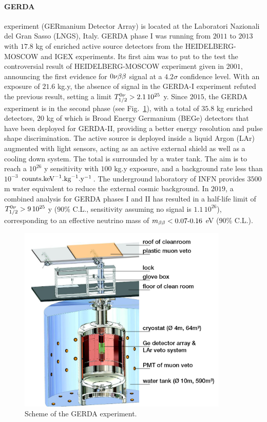 \paragraph{GERDA} experiment (GERmanium Detector Array) is located at the Laboratori Nazionali del Gran Sasso (LNGS), Italy.
GERDA phase I was running from $2011$ to $2013$ with $17.8$ kg of enriched active source detectors from the HEIDELBERG-MOSCOW and IGEX experiments.
Its first aim was to put to the test the controversial result of HEIDELBERG-MOSCOW experiment given in $2001$, announcing the first evidence for $0\nu\beta\beta$ signal at a $4.2\sigma$ confidence level.
With an exposure of $21.6$ kg.y, the absence of signal in the GERDA-I experiment refuted the previous result, setting a limit $T_{1/2}^{0\nu}>2.1\, 10^{25}$ y.
Since $2015$, the GERDA experiment is in the second phase (see Fig.~\ref{fig:GERDA}), with a total of $35.8$ kg enriched detectors, $20$ kg of which is Broad Energy Germanium (BEGe) detectors that have been deployed for GERDA-II, providing a better energy resolution and pulse shape discrimination.
The active source is deployed inside a liquid Argon (LAr) augmented with light sensors, acting as an active external shield as well as a cooling down system.
The total is surrounded by a water tank.
The aim is to reach a $10^{26}$ y sensitivity with $100$ kg.y exposure, and a background rate less than $10^{-3}$ $\text{counts.keV}^{-1}\text{.kg}^{-1}\text{.y}^{-1}$.
The underground laboratory of INFN provides $3500$ m water equivalent to reduce the external cosmic background.
In $2019$, a combined analysis for GERDA phases I and II has resulted in a half-life limit of $T_{1/2}^{0\nu}>9\, 10^{25}$ y ($90$\% C.L., sensitivity assuming no signal is $1.1\, 10^{26}$), corresponding to an effective neutrino mass of $m_{\beta\beta}<0.07\text{-}0.16$ eV ($90$\% C.L.).

\begin{figure}
  \centering
  \includegraphics[width=10cm]{neutrinophysics/fig_neutrinophysics/GERDA.png}
  \caption{Scheme of the GERDA experiment.
    \label{fig:GERDA}}
\end{figure}


